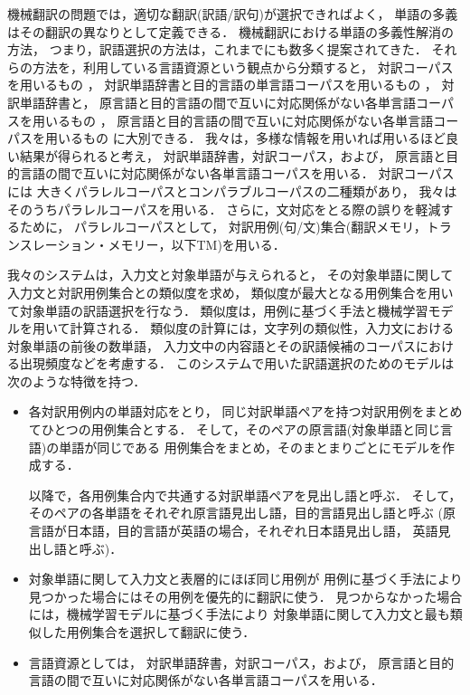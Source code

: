 機械翻訳の問題では，適切な翻訳(訳語/訳句)が選択できればよく，
単語の多義はその翻訳の異なりとして定義できる．
機械翻訳における単語の多義性解消の方法，
つまり，訳語選択の方法は，これまでにも数多く提案されてきた．
それらの方法を，利用している言語資源という観点から分類すると，
対訳コーパスを用いるもの
\cite{Nagao81,Sato90,Brown:90,Brown:93,berger:cl96,Sumita:2000,Baldwin:2001}，
対訳単語辞書と目的言語の単言語コーパスを用いるもの
\cite{Dagan:cl94,Kikui:98}，
対訳単語辞書と，
原言語と目的言語の間で互いに対応関係がない各単言語コーパスを用いるもの
\cite{Kikui:99,Koehn:2000}，
原言語と目的言語の間で互いに対応関係がない各単言語コーパスを用いるもの
\cite{Tanaka:96}
に大別できる．
我々は，多様な情報を用いれば用いるほど良い結果が得られると考え，
対訳単語辞書，対訳コーパス，および，
原言語と目的言語の間で互いに対応関係がない各単言語コーパスを用いる．
対訳コーパスには
大きくパラレルコーパスとコンパラブルコーパスの二種類があり，
我々はそのうちパラレルコーパスを用いる．
さらに，文対応をとる際の誤りを軽減するために，
パラレルコーパスとして，
対訳用例(句/文)集合(翻訳メモリ，トランスレーション・メモリー，以下TM)を用いる．

我々のシステムは，入力文と対象単語が与えられると，
その対象単語に関して入力文と対訳用例集合との類似度を求め，
類似度が最大となる用例集合を用いて対象単語の訳語選択を行なう．
類似度は，用例に基づく手法と機械学習モデルを用いて計算される．
類似度の計算には，文字列の類似性，入力文における対象単語の前後の数単語，
入力文中の内容語とその訳語候補のコーパスにおける出現頻度などを考慮する．
このシステムで用いた訳語選択のためのモデルは次のような特徴を持つ．
\begin{itemize}
\item 各対訳用例内の単語対応をとり，
  同じ対訳単語ペアを持つ対訳用例をまとめてひとつの用例集合とする．
  そして，そのペアの原言語(対象単語と同じ言語)の単語が同じである
  用例集合をまとめ，そのまとまりごとにモデルを作成する．

  以降で，各用例集合内で共通する対訳単語ペアを見出し語と呼ぶ．
  そして，そのペアの各単語をそれぞれ原言語見出し語，目的言語見出し語と呼ぶ
  (原言語が日本語，目的言語が英語の場合，それぞれ日本語見出し語，
  英語見出し語と呼ぶ)．
\item 対象単語に関して入力文と表層的にほぼ同じ用例が
  用例に基づく手法により見つかった場合にはその用例を優先的に翻訳に使う．
  見つからなかった場合には，機械学習モデルに基づく手法により
  対象単語に関して入力文と最も類似した用例集合を選択して翻訳に使う．
\item 言語資源としては，
  対訳単語辞書，対訳コーパス，および，
  原言語と目的言語の間で互いに対応関係がない各単言語コーパスを用いる．
\end{itemize}


